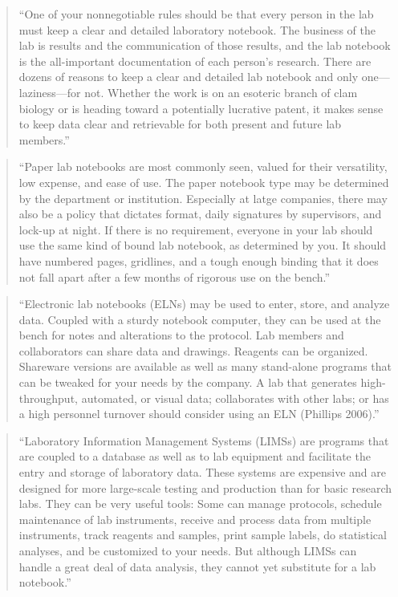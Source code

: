 \documentclass[]{tufte-book}
\begin{document}
\begin{quote}
``One of your nonnegotiable rules should be that every person in the lab must
keep a clear and detailed laboratory notebook. The business of the lab is
results and the communication of those results, and the lab notebook is the
all-important documentation of each person's research. There are dozens of
reasons to keep a clear and detailed lab notebook and only one---laziness---for
not. Whether the work is on an esoteric branch of clam biology or is heading
toward a potentially lucrative patent, it makes sense to keep data clear and retrievable for both present and future lab members.'' \citep{leips2010helm}
\end{quote}

\begin{quote}
``Paper lab notebooks are most commonly seen, valued for their versatility,
low expense, and ease of use. The paper notebook type may be determined
by the department or institution. Especially at latge companies, there may
also be a policy that dictates format, daily signatures by supervisors, and
lock-up at night. If there is no requirement, everyone in your lab should
use the same kind of bound lab notebook, as determined by you. It should have
numbered pages, gridlines, and a tough enough binding that it does not fall
apart after a few months of rigorous use on the bench.'' \citep{leips2010helm}
\end{quote}

\begin{quote}
``Electronic lab notebooks (ELNs) may be used to enter, store, and analyze
data. Coupled with a sturdy notebook computer, they can be used at the bench
for notes and alterations to the protocol. Lab members and collaborators can
share data and drawings. Reagents can be organized. Shareware versions are
available as well as many stand-alone programs that can be tweaked for your
needs by the company. A lab that generates high-throughput, automated, or
visual data; collaborates with other labs; or has a high personnel turnover
should consider using an ELN (Phillips 2006).'' \citep{leips2010helm}
\end{quote}

\begin{quote}
``Laboratory Information Management Systems (LIMSs) are programs that are
coupled to a database as well as to lab equipment and facilitate the entry
and storage of laboratory data. These systems are expensive and are designed
for more large-scale testing and production than for basic research labs. They
can be very useful tools: Some can manage protocols, schedule maintenance of
lab instruments, receive and process data from multiple instruments, track
reagents and samples, print sample labels, do statistical analyses, and be
customized to your needs. But although LIMSs can handle a great deal of
data analysis, they cannot yet substitute for a lab notebook.'' \citep{leips2010helm}
\end{quote}
\end{document}
